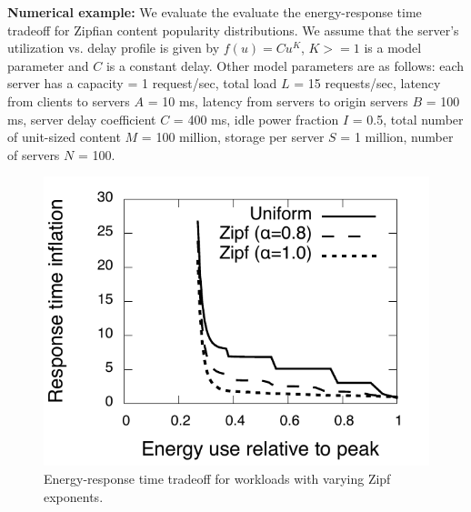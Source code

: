\textbf{Numerical example:} We evaluate the evaluate the energy-response time tradeoff for Zipfian content popularity distributions. We assume that the server's utilization vs. delay profile is given by $f(u) = Cu^K$, $K>=1$ is a model parameter and $C$ is a constant delay. Other model parameters are as follows: each server has a capacity = 1 request/sec, total load $L$ = 15 requests/sec, latency from clients to servers $A$ = 10 ms, latency from servers to origin servers $B$ = 100 ms, server delay coefficient $C$ = 400 ms, idle power fraction $I$ = 0.5, total number of unit-sized content $M$ = 100 million, storage per server $S$ = 1 million, number of servers $N$ = 100. 

\begin{figure}
  \begin{center}
    \includegraphics[scale=0.4]{graphs/vary-z.pdf}
  \end{center}
  \caption{Energy-response time tradeoff for workloads with varying Zipf exponents.}
    \label{fig:vary-z}
\end{figure}


